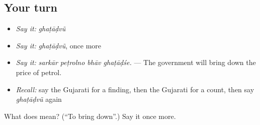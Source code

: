 \subsection*{Your turn}
\begin{itemize}
\raggedright
  \item \emph{Say it:} \emph{ghaṭāḍvũ}
  \item \emph{Say it:} \emph{ghaṭāḍvũ}, once more
  \item \emph{Say it:} \emph{sarkār peṭrolno bhāv ghaṭāḍśe.} — The government will bring down the price of petrol.
  \item \emph{Recall:} say the Gujarati for a finding, then the Gujarati for a count, then say \emph{ghaṭāḍvũ} again
\end{itemize}

\begin{tcolorbox}[breakable,colback=teal!4,colframe=teal!35!black,title={Before you move on}]
What does  mean? (\textquotedblleft{}To bring down\textquotedblright{}.) Say it once more.
\end{tcolorbox}
